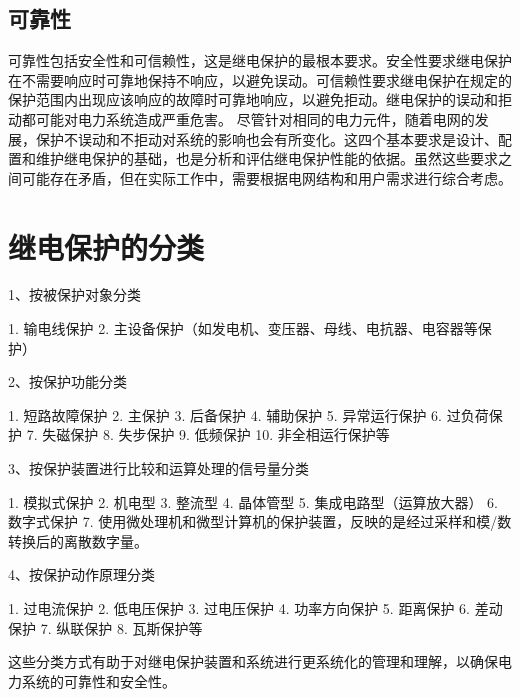 \subsection{可靠性}
可靠性包括安全性和可信赖性，这是继电保护的最根本要求。安全性要求继电保护在不需要响应时可靠地保持不响应，以避免误动。可信赖性要求继电保护在规定的保护范围内出现应该响应的故障时可靠地响应，以避免拒动。继电保护的误动和拒动都可能对电力系统造成严重危害。
尽管针对相同的电力元件，随着电网的发展，保护不误动和不拒动对系统的影响也会有所变化。这四个基本要求是设计、配置和维护继电保护的基础，也是分析和评估继电保护性能的依据。虽然这些要求之间可能存在矛盾，但在实际工作中，需要根据电网结构和用户需求进行综合考虑。

\section{继电保护的分类}
1、按被保护对象分类\par
1.	输电线保护
2.	主设备保护（如发电机、变压器、母线、电抗器、电容器等保护）\par
2、按保护功能分类\par
1.	短路故障保护
2.	主保护
3.	后备保护
4.	辅助保护
5.	异常运行保护
6.	过负荷保护
7.	失磁保护
8.	失步保护
9.	低频保护
10.	非全相运行保护等\par
3、按保护装置进行比较和运算处理的信号量分类\par
1.	模拟式保护
2.	机电型
3.	整流型
4.	晶体管型
5.	集成电路型（运算放大器）
6.	数字式保护
7.	使用微处理机和微型计算机的保护装置，反映的是经过采样和模/数转换后的离散数字量。\par
4、按保护动作原理分类\par
1.	过电流保护
2.	低电压保护
3.	过电压保护
4.	功率方向保护
5.	距离保护
6.	差动保护
7.	纵联保护
8.	瓦斯保护等\par
这些分类方式有助于对继电保护装置和系统进行更系统化的管理和理解，以确保电力系统的可靠性和安全性。

